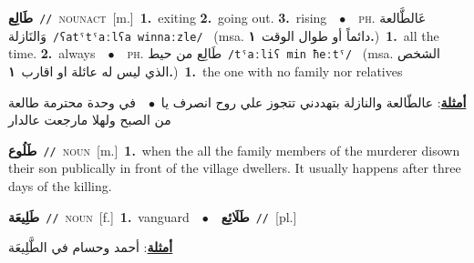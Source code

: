 \documentclass[10pt,a4paper,twoside]{article} %
\begin{document}
\begin{multicols}{2}
{\setlength\topsep{0pt}\textbf{\foreignlanguage{arabic}{طَالِع}}\ {\color{gray}\texttt{//}\color{black}}\ \textsc{noun\textunderscore act}\ [m.]\ \textbf{1.}~exiting  \textbf{2.}~going out.  \textbf{3.}~rising\ \ $\bullet$\ \ \textsc{ph.} \color{gray} \foreignlanguage{arabic}{عَالطَّالعة وَالنَازلة}\color{black}\ {\color{gray}\texttt{/{\sffamily ʕatˤtˤaːlʕa winnaːzle}/}\color{black}}\ \color{gray} (msa. \foreignlanguage{arabic}{دائماً أو طوال الوقت}~\foreignlanguage{arabic}{\textbf{١.}})\color{black}\ \textbf{1.}~all the time.  \textbf{2.}~always\ \ $\bullet$\ \ \textsc{ph.} \color{gray} \foreignlanguage{arabic}{طَالِع من حيط}\color{black}\ {\color{gray}\texttt{/{\sffamily tˤaːliʕ min ħeːtˤ}/}\color{black}}\ \color{gray} (msa. \foreignlanguage{arabic}{الشخص الذي ليس له عائلة او اقارب}~\foreignlanguage{arabic}{\textbf{١.}})\color{black}\ \textbf{1.}~the one with no family nor relatives\  \begin{flushright}\color{gray}\foreignlanguage{arabic}{\textbf{\underline{\foreignlanguage{arabic}{أمثلة}}}: عالطّالعة والنازلة بتهددني تتجوز علي روح انصرف يا\ $\bullet$\ \  في وحدة محترمة طالعة من الصبح ولهلا مارجعت عالدار}\end{flushright}\color{black}} \vspace{2mm}

{\setlength\topsep{0pt}\textbf{\foreignlanguage{arabic}{طَلُوع}}\ {\color{gray}\texttt{//}\color{black}}\ \textsc{noun}\ [m.]\ \textbf{1.}~when the all the family members of the murderer disown their son publically in front of the village dwellers. It usually happens after three days of the killing.\ } \vspace{2mm}

{\setlength\topsep{0pt}\textbf{\foreignlanguage{arabic}{طَلِيعَة}}\ {\color{gray}\texttt{//}\color{black}}\ \textsc{noun}\ [f.]\ \textbf{1.}~vanguard\ \ $\bullet$\ \ \setlength\topsep{0pt}\textbf{\foreignlanguage{arabic}{طَلَائِع}}\ {\color{gray}\texttt{//}\color{black}}\ [pl.]\  \begin{flushright}\color{gray}\foreignlanguage{arabic}{\textbf{\underline{\foreignlanguage{arabic}{أمثلة}}}: أحمد وحسام في الطَّلِيعَة}\end{flushright}\color{black}} \vspace{2mm}


\end{multicols}
\end{document}
